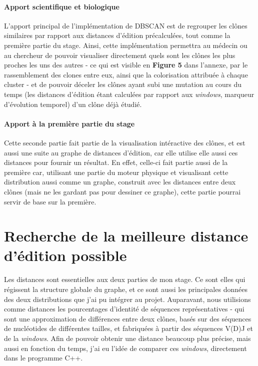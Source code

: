 \documentclass[12pt]{report}
\begin{document}
\begin{spacing}{1.2}
\subsubsection{Apport scientifique et biologique}

L'apport principal de l'implémentation de DBSCAN est de regrouper les clônes similaires par rapport aux distances d'édition précalculées, tout comme la première partie du stage.
\newline
Ainsi, cette implémentation permettra au médecin ou au chercheur de pouvoir visualiser directement quels sont les clônes les plus proches les uns des autres - ce qui est visible en \textbf{Figure 5} dans l'annexe, par le rassemblement des clones entre eux, ainsi que la colorisation attribuée à chaque cluster - et de pouvoir déceler les clônes ayant subi une mutation au cours du temps (les distances d'édition étant calculées par rapport aux \textit{windows}, marqueur d'évolution temporel) d'un clône déjà étudié.

\subsubsection{Apport à la première partie du stage}

Cette seconde partie fait partie de la visualisation intéractive des clônes, et est aussi une suite au graphe de distances d'édition, car elle utilise elle aussi ces distances pour fournir un résultat.
\newline
En effet, celle-ci fait partie aussi de la première car, utilisant une partie du moteur physique et visualisant cette distribution aussi comme un graphe, construit avec les distances entre deux clônes (mais ne les gardant pas pour dessiner ce graphe), cette partie pourrai servir de base sur la première.

\chapter{Recherche de la meilleure distance d'édition possible}

Les distances sont essentielles aux deux parties de mon stage. Ce sont elles qui régissent la structure globale du graphe, et ce sont aussi les principales données des deux distributions que j'ai pu intégrer au projet.
\newline
Auparavant, nous utilisions comme distances les pourcentages d'identité de séquences représentatives - qui sont une approximation de différences entre deux clônes, basés sur des séquences de nucléotides de différentes tailles, et fabriquées à partir des séquences V(D)J et de la \textit{windows}.
\newline
Afin de pouvoir obtenir une distance beaucoup plus précise, mais aussi en fonction du temps, j'ai eu l'idée de comparer ces \textit{windows}, directement dans le programme C++.


\end{spacing}
\end{document}
